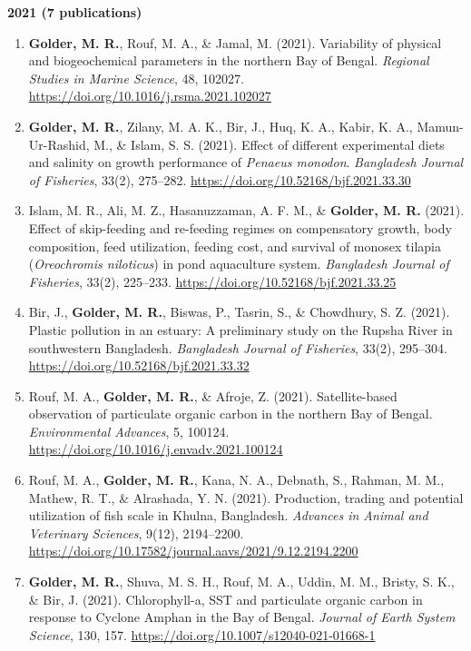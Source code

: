 \documentclass[11pt,a4paper,sans]{moderncv}
\begin{document}
\textbf{2021 (7 publications)}
\begin{enumerate}
  \item \textbf{Golder, M. R.}, Rouf, M. A., \& Jamal, M. (2021). Variability of physical and biogeochemical parameters in the northern Bay of Bengal. \textit{Regional Studies in Marine Science}, 48, 102027. \url{https://doi.org/10.1016/j.rsma.2021.102027}

  \item \textbf{Golder, M. R.}, Zilany, M. A. K., Bir, J., Huq, K. A., Kabir, K. A., Mamun-Ur-Rashid, M., \& Islam, S. S. (2021). Effect of different experimental diets and salinity on growth performance of \textit{Penaeus monodon}. \textit{Bangladesh Journal of Fisheries}, 33(2), 275–282. \url{https://doi.org/10.52168/bjf.2021.33.30}

  \item Islam, M. R., Ali, M. Z., Hasanuzzaman, A. F. M., \& \textbf{Golder, M. R.} (2021). Effect of skip-feeding and re-feeding regimes on compensatory growth, body composition, feed utilization, feeding cost, and survival of monosex tilapia (\textit{Oreochromis niloticus}) in pond aquaculture system. \textit{Bangladesh Journal of Fisheries}, 33(2), 225–233. \url{https://doi.org/10.52168/bjf.2021.33.25}

  \item Bir, J., \textbf{Golder, M. R.}, Biswas, P., Tasrin, S., \& Chowdhury, S. Z. (2021). Plastic pollution in an estuary: A preliminary study on the Rupsha River in southwestern Bangladesh. \textit{Bangladesh Journal of Fisheries}, 33(2), 295–304. \url{https://doi.org/10.52168/bjf.2021.33.32}

  \item Rouf, M. A., \textbf{Golder, M. R.}, \& Afroje, Z. (2021). Satellite-based observation of particulate organic carbon in the northern Bay of Bengal. \textit{Environmental Advances}, 5, 100124. \url{https://doi.org/10.1016/j.envadv.2021.100124}

  \item Rouf, M. A., \textbf{Golder, M. R.}, Kana, N. A., Debnath, S., Rahman, M. M., Mathew, R. T., \& Alrashada, Y. N. (2021). Production, trading and potential utilization of fish scale in Khulna, Bangladesh. \textit{Advances in Animal and Veterinary Sciences}, 9(12), 2194–2200. \url{https://doi.org/10.17582/journal.aavs/2021/9.12.2194.2200}

  \item \textbf{Golder, M. R.}, Shuva, M. S. H., Rouf, M. A., Uddin, M. M., Bristy, S. K., \& Bir, J. (2021). Chlorophyll-a, SST and particulate organic carbon in response to Cyclone Amphan in the Bay of Bengal. \textit{Journal of Earth System Science}, 130, 157. \url{https://doi.org/10.1007/s12040-021-01668-1}
\end{enumerate}
\end{document}
